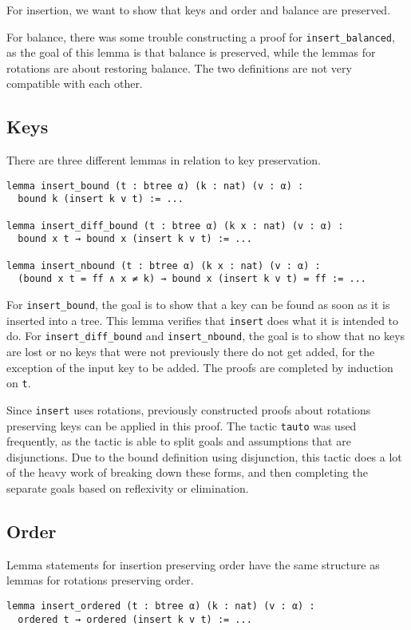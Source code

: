 For insertion, we want to show that keys and order and balance are preserved.

For balance, there was some trouble constructing a proof for \lstinline{insert_balanced}, as the goal of this lemma is that balance is preserved, while the lemmas for rotations are about restoring balance. The two definitions are not very compatible with each other.

\subsection*{Keys}
There are three different lemmas in relation to key preservation.

\begin{lstlisting}
lemma insert_bound (t : btree α) (k : nat) (v : α) :
  bound k (insert k v t) := ...

lemma insert_diff_bound (t : btree α) (k x : nat) (v : α) :
  bound x t → bound x (insert k v t) := ...

lemma insert_nbound (t : btree α) (k x : nat) (v : α) :
  (bound x t = ff ∧ x ≠ k) → bound x (insert k v t) = ff := ...
\end{lstlisting}

For \lstinline{insert_bound}, the goal is to show that a key can be found as soon as it is inserted into a tree. This lemma verifies that \lstinline{insert} does what it is intended to do. For \lstinline{insert_diff_bound} and \lstinline{insert_nbound}, the goal is to show that no keys are lost or no keys that were not previously there do not get added, for the exception of the input key to be added. The proofs are completed by induction on \lstinline{t}. 

Since \lstinline{insert} uses rotations, previously constructed proofs about rotations preserving keys can be applied in this proof. The tactic \lstinline{tauto} was used frequently, as the tactic is able to split goals and assumptions that are disjunctions. Due to the bound definition using disjunction, this tactic does a lot of the heavy work of breaking down these forms, and then completing the separate goals based on reflexivity or elimination.

\subsection*{Order}
Lemma statements for insertion preserving order have the same structure as lemmas for rotations preserving order.

\begin{lstlisting}
lemma insert_ordered (t : btree α) (k : nat) (v : α) :
  ordered t → ordered (insert k v t) := ...
\end{lstlisting}

